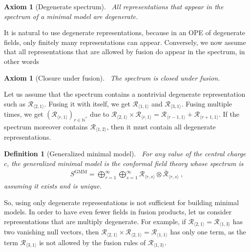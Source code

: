 \documentclass[12pt, a4paper]{article}
\theoremstyle{break}
\newtheorem{hyp}[exo]{Axiom}
\newtheorem{defn}[exo]{Definition}
\begin{document}
\begin{hyp}[Degenerate spectrum]
 ~\label{hyp:deg}
 All representations that appear in the spectrum of a minimal model are degenerate.
\end{hyp}
It is natural to use degenerate representations, because in an OPE of degenerate fields, only finitely many representations can appear. Conversely, we now assume that all representations that are allowed by fusion do appear in the spectrum, in other words

\begin{hyp}[Closure under fusion]
 ~\label{hyp:stab}
 The spectrum is closed under fusion. 
\end{hyp}

Let us assume that the spectrum contains a nontrivial degenerate representation such as $\mathcal{R}_{\langle 2,1\rangle}$. Fusing it with itself, we get $\mathcal{R}_{\langle 1, 1\rangle}$ and $\mathcal{R}_{\langle 3,1\rangle}$. Fusing multiple times, we get $(\mathcal{R}_{\langle r, 1\rangle})_{r\in\mathbb{N}^*}$ due to $\mathcal{R}_{\langle 2,1\rangle} \times \mathcal{R}_{\langle r,1\rangle} = \mathcal{R}_{\langle r-1,1\rangle}  + \mathcal{R}_{\langle r+1,1\rangle}$. If the spectrum moreover contains $\mathcal{R}_{\langle 1,2\rangle}$, then it must contain all degenerate representations. 

\begin{defn}[Generalized minimal model]
 ~\label{def:gmm}
 For any value of the central charge $c$, the generalized minimal model is the conformal field theory whose spectrum is
 \begin{align}
  S^\mathrm{GMM} = \bigoplus_{r=1}^\infty \bigoplus_{s=1}^\infty \mathcal{R}_{\langle r,s \rangle}\otimes  \mathcal{\bar R}_{\langle r,s \rangle} \ ,
 \end{align}
 assuming it exists and is unique.
\end{defn}

So, using only degenerate representations is not sufficient for building minimal models.
In order to have even fewer fields in fusion products, let us consider representations that are multiply degenerate. For example, if $\mathcal{R}_{\langle 2, 1\rangle} = \mathcal{R}_{\langle 1, 3\rangle}$ has two vanishing null vectors, then $\mathcal{R}_{\langle 2, 1\rangle} \times \mathcal{R}_{\langle 2, 1\rangle} = \mathcal{R}_{\langle 1,1\rangle}$ has only one term, as the term $\mathcal{R}_{\langle 3, 1\rangle}$ is not allowed by the fusion rules of $\mathcal{R}_{\langle 1, 3\rangle}$.
\end{document}
